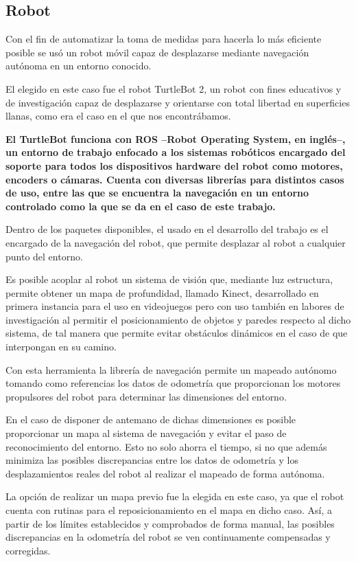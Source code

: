 \subsection{Robot}

Con el fin de automatizar la toma de medidas para hacerla lo más eficiente posible se usó un robot móvil capaz de desplazarse mediante navegación autónoma en un entorno conocido.

El elegido en este caso fue el robot TurtleBot 2, un robot con fines educativos y de investigación capaz de desplazarse y orientarse con total libertad en superficies llanas, como era el caso en el que nos encontrábamos.

\textbf{El TurtleBot funciona con ROS --Robot Operating System, en inglés--, un entorno de trabajo enfocado a los sistemas robóticos encargado del soporte para todos los dispositivos hardware del robot como motores, encoders o cámaras. 
Cuenta con diversas librerías para distintos casos de uso, entre las que se encuentra la navegación en un entorno controlado como la que se da en el caso de este trabajo.}

Dentro de los paquetes disponibles, el usado en el desarrollo del trabajo es el encargado de la navegación del robot, que permite desplazar al robot a cualquier punto del entorno.

Es posible acoplar al robot un sistema de visión que, mediante luz estructura, permite obtener un mapa de profundidad, llamado Kinect, desarrollado en primera instancia para el uso en videojuegos pero con uso también en labores de investigación al permitir el posicionamiento de objetos y paredes respecto al dicho sistema, de tal manera que permite evitar obstáculos dinámicos en el caso de que interpongan en su camino.

Con esta herramienta la librería de navegación permite un mapeado autónomo tomando como referencias los datos de odometría que proporcionan los motores propulsores del robot para determinar las dimensiones del entorno.

En el caso de disponer de antemano de dichas dimensiones es posible proporcionar un mapa al sistema de navegación y evitar el paso de reconocimiento del entorno.
Esto no solo ahorra el tiempo, si no que además minimiza las posibles discrepancias entre los datos de odometría y los desplazamientos reales del robot al realizar el mapeado de forma autónoma.

La opción de realizar un mapa previo fue la elegida en este caso, ya que el robot cuenta con rutinas para el reposicionamiento en el mapa en dicho caso.
Así, a partir de los límites establecidos y comprobados de forma manual, las posibles discrepancias en la odometría del robot se ven continuamente compensadas y corregidas.

